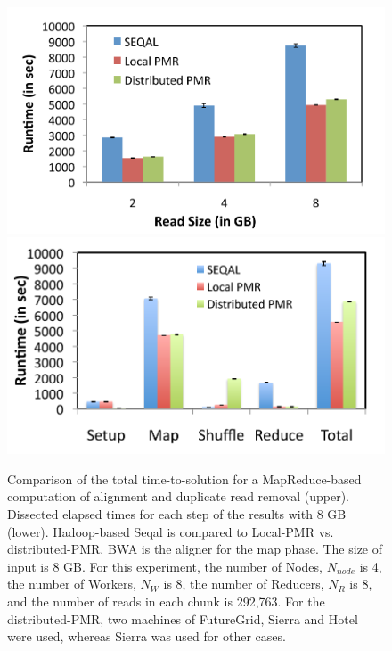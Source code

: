 \documentclass{acm_proc_article-sp}
\begin{document}
\begin{figure}
 \centering
\includegraphics[scale=0.50]{figures/seqalvslocalpmr.pdf}
\includegraphics[scale=0.52]{figures/8GB_phasewisetimes.pdf}

\caption{\small Comparison of the total time-to-solution for a MapReduce-based computation of alignment and duplicate read removal (upper).  Dissected elapsed times for each step of the results with 8 GB (lower). Hadoop-based Seqal is compared to Local-PMR vs. distributed-PMR.  BWA is the aligner for the map phase.  The size of input is 8 GB.  For this experiment, the number of Nodes, $N_{node}$ is 4, the number of Workers, $N_W$ is 8, the number of Reducers, $N_R$ is 8, and the number of reads in each chunk is 292,763. For the distributed-PMR, two machines of FutureGrid, Sierra and Hotel were used, whereas Sierra was used for other cases.}
  \label{fig:comp_with_seqal_1} 
\end{figure}
\end{document}
